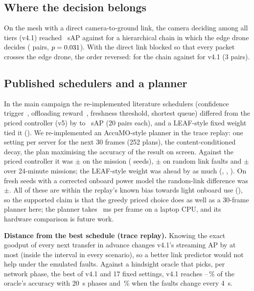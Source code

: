 \documentclass[conference]{IEEEtran}
\begin{document}
\subsection{Where the decision belongs}\label{sec:topology}
On the mesh with a direct camera-to-ground link, the camera deciding among all tiers (v4.1) reached \TopoDirectV{}~sAP
against \TopoDirectH{} for a hierarchical chain in which the edge drone decides (\TopoDirectPairs{} pairs,
$p=0.031{}$). With the direct link blocked so that every packet crosses the edge drone, the order reversed:
\TopoMultiH{} for the chain against \TopoMultiV{} for v4.1 (3 pairs).

\subsection{Published schedulers and a planner}\label{sec:planner}
In the main campaign the re-implemented literature schedulers (confidence trigger~\cite{Gomez_2024}, offloading
reward~\cite{Qiu_2024}, freshness threshold, shortest queue) differed from the priced controller (v5) by \MainLitMin{}
to \MainLitMax{}~sAP (20 pairs each), and a LEAF-style fixed weight~\cite{Wang_2023} tied it (\MainLeaf{}). We re-implemented an
AccuMO-style planner in the trace replay: one setting per server for the next 30 frames (252 plans), the
content-conditioned decay, the plan maximising the accuracy of the result on screen. Against the priced controller it
was \MpcMission{}$\pm$\MpcMissionCi{} on the mission (\MpcMissionN{} seeds), \MpcRandom{}$\pm$\MpcRandomCi{} on random
link faults and \MpcLong{}$\pm$\MpcLongCi{} over 24-minute missions; the LEAF-style weight was ahead by as much
(\LeafMission{}, \LeafRandom{}, \LeafLong{}). On fresh seeds with a corrected onboard power model the random-link
difference was \MpcHeldRandom{}$\pm$\MpcHeldRandomCi{}. All of these are within the replay's known bias towards light
onboard use (\ReplayLeafBias{}), so the supported claim is that the greedy priced choice does as well as a 30-frame
planner here; the planner takes \MpcMs{}~ms per frame on a laptop CPU, and its hardware comparison is future work.

\textbf{Distance from the best schedule (trace replay).} Knowing the exact goodput of every next transfer in advance
changes v4.1's streaming AP by at most \ClairMax{} (inside the interval in every scenario), so a better link predictor
would not help under the emulated faults. Against a hindsight oracle that picks, per network phase, the best of v4.1
and 17 fixed settings, v4.1 reaches \OracleShareMin--\OracleShareMax\,\% of the oracle's accuracy with 20~s phases and
\OracleShareRandom\,\% when the faults change every 4~s.
\end{document}
